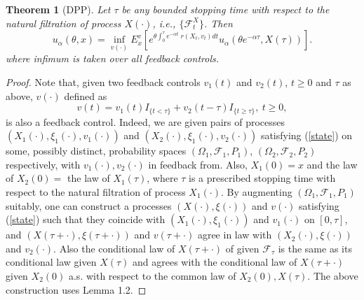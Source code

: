 \documentclass[11pt]{amsart}
\newtheorem{theorem}{\bf Theorem}[section]
\numberwithin{equation}{section}
\begin{document}
\begin{theorem}[DPP]
Let $\tau$ be any bounded stopping time with respect to the natural filtration of process $X(\cdot)$, i.e., $\{ \mathcal F^X_t\}$. 
Then 
\begin{equation}\label{DPP}
 u_{\alpha}(\theta,x) = \inf_{v(\cdot)} E^v_x\left[ e^{\theta\int_{0}^{\tau} e^{-\alpha t} \; r(X_t,v_t) dt}
u_{\alpha}\left(\theta e^{-\alpha \tau}, X(\tau)\right) \right]. 
\end{equation}
where infimum is taken over all feedback controls.
\end{theorem}
\begin{proof} Note that, given two feedback controls $v_1(t)$ and $v_2(t)$,  $t\geq 0$ and $\tau$ as
above, $v(\cdot)$ defined as
\begin{equation}\label{control_dpp}
 v(t) = v_1(t) I_{\{ t < \tau \} } + v_2(t-\tau) I_{\{ t \geq \tau \} }, \ t\geq 0,
\end{equation}
is also a feedback control. Indeed, we are given pairs of processes 
$(X_1(\cdot), \xi_1(\cdot), v_1(\cdot))$ and
$(X_2(\cdot), \xi_1(\cdot), v_2(\cdot))$ satisfying (\ref{state}) on some, possibly distinct, probability spaces 
$(\Omega_1,\mathcal F_1,P_1)$, $(\Omega_2,\mathcal F_2,P_2)$ respectively, with $v_1(\cdot), v_2(\cdot)$ in
feedback from. Also, $X_1(0)=x$ and the law of 
 $X_2(0)=$ the law of $X_1(\tau)$, where $\tau$ is a prescribed stopping time with respect to the natural filtration of process $X_1(\cdot)$. By augmenting $(\Omega_1,\mathcal F_1,P_1)$ suitably, one can construct a processes $(X(\cdot), \xi(\cdot))$  and $v(\cdot)$
 satisfying (\ref{state}) such that they coincide with $(X_1(\cdot), \xi_1(\cdot))$ and $v_1(\cdot)$ on
 $[0,\tau]$, and $(X(\tau+\cdot), \xi(\tau+\cdot))$ and $v(\tau+\cdot)$ agree in law with $(X_2(\cdot),\xi(\cdot))$ and $v_2(\cdot)$. Also the conditional law of $X(\tau+\cdot)$ of given 
 $\mathcal F_{\tau}$ is the same as its conditional law given $X(\tau)$ and agrees with the conditional
 law of $X(\tau+\cdot)$ given $X_2(0)$ a.s. with respect to the common law of $X_2(0),X(\tau)$.
The above construction uses Lemma 1.2. 


\end{proof}
\end{document}
